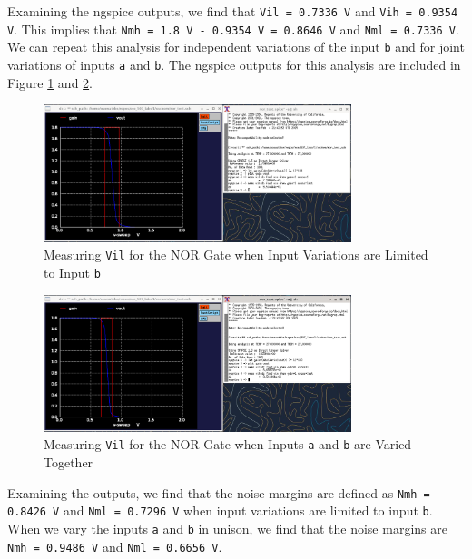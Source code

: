 \documentclass[fleqn]{article}
\begin{document}
	Examining the ngspice outputs, we find that \texttt{Vil = 0.7336 V} and \texttt{Vih = 0.9354 V}. This implies that \texttt{Nmh = 1.8 V - 0.9354 V = 0.8646 V} and \texttt{Nml = 0.7336 V}. We can repeat this analysis for independent variations of the input \texttt{b} and for joint variations of inputs \texttt{a} and \texttt{b}. The ngspice outputs for this analysis are included in Figure \ref{fig::nor_noise_analysis_sweep_vb} and \ref{fig::nor_noise_analysis_sweep_va_vb}.
	
	\begin{figure}[H]
		\centerline{\includegraphics[width=0.8\textwidth]{nor_noise_analysis_sweep_vb.png}}
		\caption{Measuring \texttt{Vil} for the NOR Gate when Input Variations are Limited to Input \texttt{b}}
		\label{fig::nor_noise_analysis_sweep_vb}
	\end{figure}
	
	\begin{figure}[H]
		\centerline{\includegraphics[width=0.8\textwidth]{nor_noise_analysis_sweep_va_vb.png}}
		\caption{Measuring \texttt{Vil} for the NOR Gate when Inputs \texttt{a} and \texttt{b} are Varied Together}
		\label{fig::nor_noise_analysis_sweep_va_vb}
	\end{figure}
	
	Examining the outputs, we find that the noise margins are defined as \texttt{Nmh = 0.8426 V} and \texttt{Nml = 0.7296 V} when input variations are limited to input \texttt{b}. When we vary the inputs \texttt{a} and \texttt{b} in unison, we find that the noise margins are \texttt{Nmh = 0.9486 V} and \texttt{Nml = 0.6656 V}.
	
\end{document}

